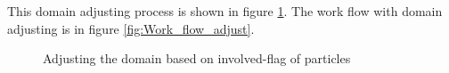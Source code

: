 \documentclass[conference,compsoc]{IEEEtran}
\begin{document}
This domain adjusting process is shown in figure \ref{fig:Domain_adjusting}.
The work flow with domain adjusting is in figure \ref{fig:Work_flow_adjust}.
\begin{figure}[!t]
\centering
{}
\label{fig:Involved_initial}
\hfil
{}
\label{fig:Involved_domain_adjusting}
\caption{ Adjusting the domain based on involved-flag of particles}
\label{fig:Domain_adjusting}
\end{figure}
\end{document}
